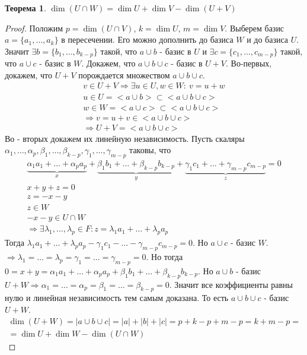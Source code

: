 \documentclass[a4paper,12pt]{article}
\newtheorem*{Theorem}{Теорема}
\begin{document}
\begin{Theorem}
$\dim \left(U \cap W\right) = \dim U + \dim V - \dim \left(U+V\right)$
\end{Theorem}

\begin{proof}
Положим $p = \dim \left(U \cap V\right)$, $k = \dim U$, $m = \dim V$. Выберем базис $a = \{ a_1, \ldots, a_k\}$ в пересечении. Его можно дополнить до базиса $W$ и до базиса $U$. Значит $\exists b = \{ b_1, \ldots, b_{k-p}\}$ такой, что $a\cup b$ - базис в $U$ и $\exists c = \{ c_1, \ldots, c_{m-p}\}$ такой, что $a \cup c$ - базис в $W$. Докажем, что $a \cup b \cup c$ - базис в $U+V$.
Во-первых, докажем, что $U+V$ порождается множеством $a \cup b \cup c$.
\begin{gather*}
    v \in U+V \Rightarrow \exists u \in U, w \in W\colon \ v = u+w\\
    u \in U=<a \cup b> \subset <a \cup b \cup c>\\
    w \in W=<a \cup c> \subset <a \cup b \cup c>\\
    \Rightarrow v = u + v \in <a \cup b \cup c>\\
    \Rightarrow U + V = <a \cup b \cup c>
\end{gather*}
Во - вторых докажем их линейную независимость. Пусть скаляры $\alpha_1, \ldots, \alpha_p, \beta_1, \ldots, \beta_{k-p}, \gamma_1, \ldots, \gamma_{m-p}$ таковы, что 
\begin{gather*}
\underbrace{\alpha_1a_1+ \ldots +\alpha_pa_p}_x + \underbrace{\beta_1b_1+ \ldots +\beta_{k-p}b_{k-p}}_y + \underbrace{\gamma_1c_1 + \ldots + \gamma_{m-p}c_{m-p}}_z=0\\
x+y+z = 0\\
z = -x -y\\
z \in W\\
-x-y \in U\cap W\\
\Rightarrow \exists \lambda_1,\ldots, \lambda_p \in F \colon z = \lambda_1a_1+\ldots+\lambda_pa_p 
\end{gather*}
Тогда $\lambda_1a_1 + \ldots + \lambda_pa_p - \gamma_1c_1 - \ldots - \gamma_{m-p}c_{m-p} = 0$. Но $a \cup c$ - базис $W$. $\Rightarrow \lambda_1 = \ldots = \lambda_p = \gamma_1 = \ldots = \gamma_{m-p} = 0$. Но тогда $0 = x+y = \alpha_1a_1 + \ldots + \alpha_pa_p + \beta_1b_1 + \ldots + \beta_{k-p}b_{k-p}$. Но $a\cup b$ - базис $U+W \Rightarrow \alpha_1 = \ldots = \alpha_p = \beta_1 = \ldots = \beta_{k-p} = 0$. Значит все коэффициенты равны нулю и линейная независимость тем самым доказана. То есть $a \cup b \cup c$ - базис $U+W$. 
\begin{gather*}
    \dim \left(U+W\right) = |a\cup b \cup c| = |a| + |b| + |c| = p + k-p + m-p = k + m -p =\\
    =\dim U + \dim W - \dim\left(U\cap W\right)
\end{gather*}
\end{proof}
\end{document}
